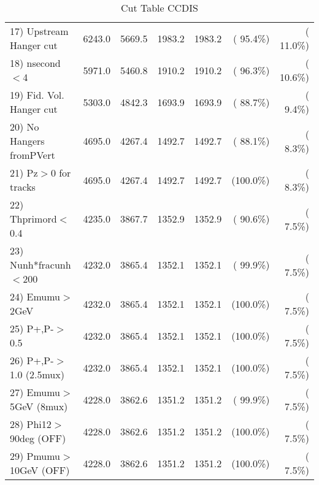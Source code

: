 \begin{table}[h!]
\begin{tabular}{||l||r|r|r|r|r|r||}
 17) Upstream Hanger cut  &       6243.0 &       5669.5 &       1983.2 &       1983.2 & ( 95.4\%) & ( 11.0\%) \\
 18) nsecond$<$4          &       5971.0 &       5460.8 &       1910.2 &       1910.2 & ( 96.3\%) & ( 10.6\%) \\
 19) Fid. Vol. Hanger cut &       5303.0 &       4842.3 &       1693.9 &       1693.9 & ( 88.7\%) & (  9.4\%) \\
 20) No Hangers fromPVert &       4695.0 &       4267.4 &       1492.7 &       1492.7 & ( 88.1\%) & (  8.3\%) \\
 21) Pz$>$0 for tracks    &       4695.0 &       4267.4 &       1492.7 &       1492.7 & (100.0\%) & (  8.3\%) \\
 22) Thprimord$<$0.4      &       4235.0 &       3867.7 &       1352.9 &       1352.9 & ( 90.6\%) & (  7.5\%) \\
 23) Nunh*fracunh$<$200   &       4232.0 &       3865.4 &       1352.1 &       1352.1 & ( 99.9\%) & (  7.5\%) \\
 24) Emumu$>$2GeV         &       4232.0 &       3865.4 &       1352.1 &       1352.1 & (100.0\%) & (  7.5\%) \\
 25) P+,P-$>$0.5          &       4232.0 &       3865.4 &       1352.1 &       1352.1 & (100.0\%) & (  7.5\%) \\
 26) P+,P-$>$1.0 (2.5mux) &       4232.0 &       3865.4 &       1352.1 &       1352.1 & (100.0\%) & (  7.5\%) \\
 27) Emumu$>$5GeV  (8mux) &       4228.0 &       3862.6 &       1351.2 &       1351.2 & ( 99.9\%) & (  7.5\%) \\
 28) Phi12$>$90deg  (OFF) &       4228.0 &       3862.6 &       1351.2 &       1351.2 & (100.0\%) & (  7.5\%) \\
 29) Pmumu$>$10GeV  (OFF) &       4228.0 &       3862.6 &       1351.2 &       1351.2 & (100.0\%) & (  7.5\%) \\
 \hline
 \hline
 \end{tabular}
 \caption{Cut Table  CCDIS    }
 \label{tab-cutcohjpsi-mumu_ccdis}
 \end{table}
